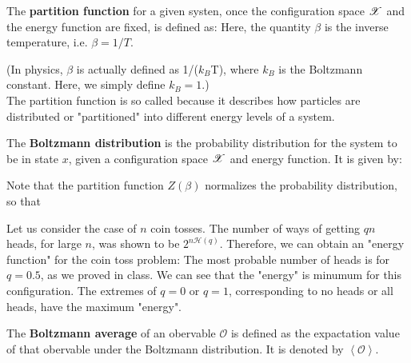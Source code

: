 \documentclass[letterpaper,english,12pt]{article}
\begin{document}
\begin{defn}
The \textbf{partition function} for a given systen, once the configuration space $\mathscr{X}$ and the energy function are fixed, is defined as: 
Here, the quantity $\beta$ is the inverse temperature, i.e. $\beta=1/T$. 
\end{defn}
(In physics, $\beta$ is actually defined as 1/($k_B$T), where $k_B$ is the Boltzmann constant. Here, we simply define $k_B=1$.) \\
The partition function is so called because it describes how particles are distributed or "partitioned" into different energy levels of a system.
\begin{defn} 
The \textbf{Boltzmann distribution} is the probability distribution for the system to be in state $x$, given a configuration space 
$\mathscr{X}$ and energy function. It is given by: 
\end{defn}
Note that the partition function $Z(\beta)$ normalizes the probability distribution, so that
\begin{exmp} \begin{shaded*}
Let us consider the case of $n$ coin tosses. The number of ways of getting $qn$ heads, for large $n$, was shown to be $2^{n \mathcal{H}(q)}$. Therefore, we can obtain an "energy function" for the coin toss problem:
The most probable number of heads is for $q=0.5$, as we proved in class. We can see that the "energy" is minumum for this configuration. The extremes of $q=0$ or $q=1$, corresponding to no heads or all heads, have the maximum "energy".
\end{shaded*}\end{exmp}
\begin{defn}
The \textbf{Boltzmann average} of an obervable $\mathcal{O}$ is defined as the expactation value of that obervable under the Boltzmann distribution. It is denoted by $\left\langle\mathcal{O}\right\rangle$.
\
\end{defn}
\end{document}
